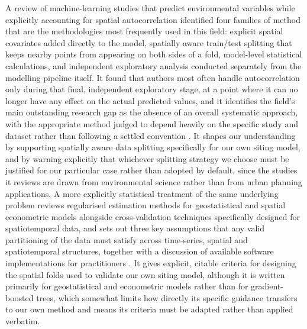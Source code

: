 \documentclass[journal]{IEEEtran}
\begin{document}
A review of machine-learning studies that predict environmental variables while explicitly accounting for spatial autocorrelation identified four families of method that are the methodologies most frequently used in this field: explicit spatial covariates added directly to the model, spatially aware train/test splitting that keeps nearby points from appearing on both sides of a fold, model-level statistical calculations, and independent exploratory analysis conducted separately from the modelling pipeline itself. It found that authors most often handle autocorrelation only during that final, independent exploratory stage, at a point where it can no longer have any effect on the actual predicted values, and it identifies the field's main outstanding research gap as the absence of an overall systematic approach, with the appropriate method judged to depend heavily on the specific study and dataset rather than following a settled convention \cite{jemeljanova2024}. It shapes our understanding by supporting spatially aware data splitting specifically for our own siting model, and by warning explicitly that whichever splitting strategy we choose must be justified for our particular case rather than adopted by default, since the studies it reviews are drawn from environmental science rather than from urban planning applications. A more explicitly statistical treatment of the same underlying problem reviews regularised estimation methods for geostatistical and spatial econometric models alongside cross-validation techniques specifically designed for spatiotemporal data, and sets out three key assumptions that any valid partitioning of the data must satisfy across time-series, spatial and spatiotemporal structures, together with a discussion of available software implementations for practitioners \cite{otto2024}. It gives explicit, citable criteria for designing the spatial folds used to validate our own siting model, although it is written primarily for geostatistical and econometric models rather than for gradient-boosted trees, which somewhat limits how directly its specific guidance transfers to our own method and means its criteria must be adapted rather than applied verbatim.



\end{document}
